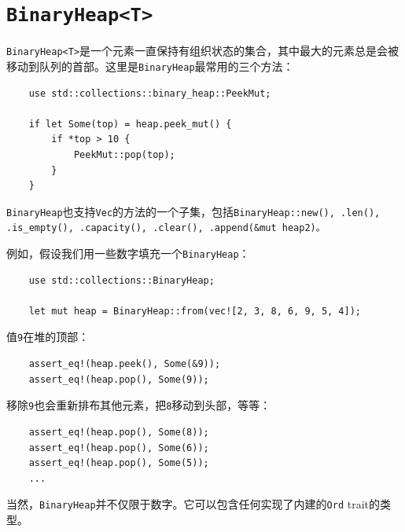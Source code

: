 \section{\texttt{BinaryHeap<T>}}

\texttt{BinaryHeap<T>}是一个元素一直保持有组织状态的集合，其中最大的元素总是会被移动到队列的首部。这里是\texttt{BinaryHeap}最常用的三个方法：




\begin{verbatim}
    use std::collections::binary_heap::PeekMut;

    if let Some(top) = heap.peek_mut() {
        if *top > 10 {
            PeekMut::pop(top);
        }
    }
\end{verbatim}

\texttt{BinaryHeap}也支持\texttt{Vec}的方法的一个子集，包括\texttt{BinaryHeap::new(), .len(), .is\_empty(), .capacity(), .clear(), .append(\&mut heap2)。}

例如，假设我们用一些数字填充一个\texttt{BinaryHeap}：
\begin{verbatim}
    use std::collections::BinaryHeap;

    let mut heap = BinaryHeap::from(vec![2, 3, 8, 6, 9, 5, 4]);
\end{verbatim}

值\texttt{9}在堆的顶部：
\begin{verbatim}
    assert_eq!(heap.peek(), Some(&9));
    assert_eq!(heap.pop(), Some(9));
\end{verbatim}

移除\texttt{9}也会重新排布其他元素，把\texttt{8}移动到头部，等等：
\begin{verbatim}
    assert_eq!(heap.pop(), Some(8));
    assert_eq!(heap.pop(), Some(6));
    assert_eq!(heap.pop(), Some(5));
    ...
\end{verbatim}

当然，\texttt{BinaryHeap}并不仅限于数字。它可以包含任何实现了内建的\texttt{Ord} trait的类型。

